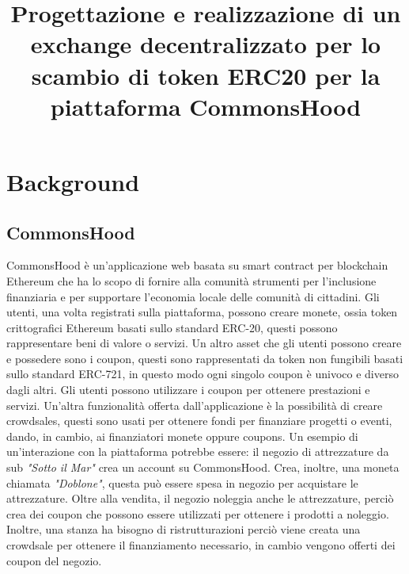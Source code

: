 \documentclass[a4paper]{article}
\title{Progettazione e realizzazione di un exchange decentralizzato per lo scambio di token ERC20 per la piattaforma CommonsHood}
\begin{document}
    \tableofcontents
    \newpage
    \section{Background}
    \subsection{CommonsHood}
    CommonsHood è un’applicazione web basata su smart contract per blockchain Ethereum che ha lo scopo di fornire alla comunità strumenti per l’inclusione finanziaria e per supportare l’economia locale delle comunità di cittadini.
    Gli utenti, una volta registrati sulla piattaforma, possono creare monete, ossia token crittografici Ethereum basati sullo standard ERC-20, questi possono rappresentare beni di valore o servizi.
    Un altro asset che gli utenti possono creare e possedere sono i coupon, questi sono rappresentati da token non fungibili basati sullo standard ERC-721, in questo modo ogni singolo coupon è univoco e diverso dagli altri.
    Gli utenti possono utilizzare i coupon per ottenere prestazioni e servizi.
    \newline
    Un'altra funzionalità offerta dall'applicazione è la possibilità di creare crowdsales, questi sono usati per ottenere fondi per finanziare progetti o eventi, dando, in cambio, ai finanziatori monete oppure coupons.
    Un esempio di un'interazione con la piattaforma potrebbe essere: il negozio di attrezzature da sub \emph{"Sotto il Mar"} crea un account su CommonsHood. Crea, inoltre, una moneta chiamata \emph{"Doblone"}, questa può essere spesa in negozio
    per acquistare le attrezzature. Oltre alla vendita, il negozio noleggia anche le attrezzature, perciò crea dei coupon che possono essere utilizzati per ottenere i prodotti a noleggio.
    Inoltre, una stanza ha bisogno di ristrutturazioni perciò viene creata una crowdsale per ottenere il finanziamento necessario, in cambio vengono offerti dei coupon del negozio.
    
\end{document}
